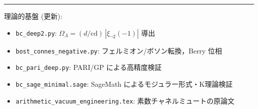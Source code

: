 \documentclass[11pt,a4paper]{article}
\begin{document}
\vspace{1em}
\hrule
\vspace{0.5em}
\small
\noindent
理論的基盤 (更新):
\begin{itemize}
\item \texttt{bc\_deep2.py}: $\Omega_\Lambda = (d/\mathrm{cd})\,|\xi_{\neg 2}(-1)|$ 導出
\item \texttt{bost\_connes\_negative.py}: フェルミオン/ボソン転換，Berry 位相
\item \texttt{bc\_pari\_deep.py}: PARI/GP による高精度検証
\item \texttt{bc\_sage\_minimal.sage}: SageMath によるモジュラー形式・K理論検証
\item \texttt{arithmetic\_vacuum\_engineering.tex}: 素数チャネルミュートの原論文
\end{itemize}
\end{document}
